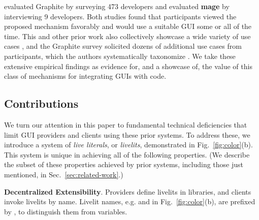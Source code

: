 \citet{Graphite} evaluated Graphite by surveying 473 developers 
and \citet{DBLP:conf/uist/KeryRHMWP20} evaluated \textbf{mage} by interviewing 9 developers.
Both studies found that
participants viewed the proposed mechanism favorably and 
would use a suitable GUI some or all of the time.
This and other prior work also collectively showcase a wide variety of use cases \cite{Graphite,DBLP:conf/uist/KeryRHMWP20,interactive-visual-syntax}, 
and the Graphite survey solicited dozens of additional use cases from participants,
which the authors systematically taxonomize \cite{Graphite}. 
We take these extensive empirical findings   
as evidence for, and a showcase of, 
the value of this class of mechanisms for integrating GUIs with code.

\subsection{Contributions}

We turn our attention in this paper to fundamental technical
deficiencies that limit GUI providers and clients using these prior systems.
To address these, 
we introduce a system of \emph{live literals}, or \emph{livelits}, 
demonstrated in Fig.~\ref{fig:color}(b). 
This system is unique in achieving all of the following properties.
(We describe the subset of these properties 
achieved by prior systems,
including those just mentioned, 
in Sec.~\ref{sec:related-work}.)

\newcommand{\llproperty}[1]{\vspace{5px}\noindent\textbf{#1}.}

\llproperty{Decentralized Extensibility}
    Providers define livelits in libraries, and 
    clients invoke livelits by name. Livelit names, e.g.  and  in Fig.~\ref{fig:color}(b),  are prefixed by \li{\$},    
    to distinguish them from variables.
 
